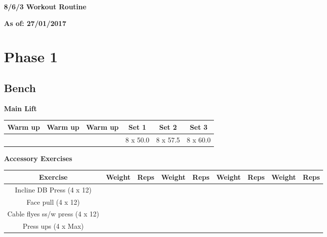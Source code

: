 \documentclass{article}%
\begin{document}
%
\normalsize%
\pagestyle{header}%
\begin{Large}%
\textbf{8/6/3 Workout Routine}%
\end{Large}%
\linebreak%
\begin{large}%
\textbf{As of: 27/01/2017}%
\end{large}%
\linebreak%
\section*{Phase 1}%
\subsection*{Bench}%
\vspace*{20pt}%
\linebreak%
\begin{minipage}{0.5\textwidth}%
\textbf{Main Lift\newline%
\newline%
}%
\begin{tabular}{|c|c|c|c|c|c|}%
\hline%
Warm up&Warm up&Warm up&Set 1&Set 2&Set 3\\%
\hline%
&&&8 x 50.0&8 x 57.5&8 x 60.0\\%
\hline%
\end{tabular}%
\vspace*{20pt}%
\linebreak%
\textbf{Accessory Exercises\newline%
\newline%
}%
\begin{tabular}{|c|c|c|c|c|c|c|c|c|}%
\hline%
Exercise&Weight&Reps&Weight&Reps&Weight&Reps&Weight&Reps\\%
\hline%
Incline DB Press (4 x 12)&&&&&&&&\\%
\hline%
Face pull (4 x 12)&&&&&&&&\\%
\hline%
Cable flyes ss/w press (4 x 12)&&&&&&&&\\%
\hline%
Press ups (4 x Max)&&&&&&&&\\%
\hline%
\end{tabular}%
\end{minipage}%
\vspace*{20pt}%
\linebreak

%
\end{document}
